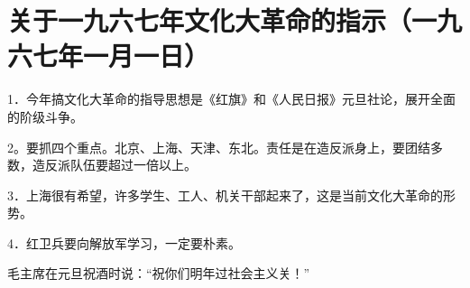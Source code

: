 \section[关于一九六七年文化大革命的指示（一九六七年一月一日）]{关于一九六七年文化大革命的指示（一九六七年一月一日）}


1．今年搞文化大革命的指导思想是《红旗》和《人民日报》元旦社论，展开全面的阶级斗争。

2。要抓四个重点。北京、上海、天津、东北。责任是在造反派身上，要团结多数，造反派队伍要超过一倍以上。

3．上海很有希望，许多学生、工人、机关干部起来了，这是当前文化大革命的形势。

4．红卫兵要向解放军学习，一定要朴素。

毛主席在元旦祝酒时说：“祝你们明年过社会主义关！”


